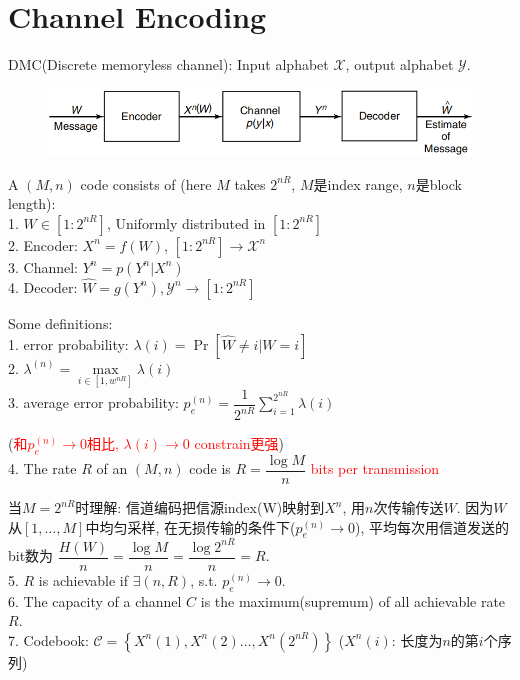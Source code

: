 \section{Channel Encoding}
\begin{definition}
DMC(Discrete memoryless channel): Input alphabet $\mathcal{X}$, output alphabet $\mathcal{Y}$.
\end{definition}
\begin{figure}[htbp]
    \centering
    \includegraphics[width=\textwidth]{./figures/chapter5/communication_system.png}
\end{figure}
A $(M, n)$ code consists of (here $M$ takes $2^{nR}$, $M$是index range, $n$是block length): \\
1. $W\in[1:2^{nR}]$, Uniformly distributed in $[1:2^{nR}]$ \\
2. Encoder: $X^n=f(W)$, $[1:2^{nR}]\to\mathcal{X}^n$ \\
3. Channel: $Y^n=p(Y^n|X^n)$ \\
4. Decoder: $\hat{W}=g(Y^n), \mathcal{Y}^n\to[1:2^{nR}]$

Some definitions: \\
1. error probability: $\lambda(i)=\Pr\left[\hat{W}\neq i | W=i\right]$ \\
2. $\lambda^{(n)}=\max\limits_{i\in[1,w^{nR}]}\lambda(i)$ \\
3. average error probability: $p_e^{(n)}=\dfrac{1}{2^{nR}}\sum\limits_{i=1}^{2^{nR}} \lambda(i)$

(\textcolor{red}{和$p_e^{(n)}\to 0$相比, $\lambda(i)\to 0$ constrain更强}) \\
4. The rate $R$ of an $(M,n)$ code is $R=\dfrac{\log M}{n}$ \textcolor{red}{bits per transmission}

当$M=2^{nR}$时理解: 信道编码把信源index(W)映射到$X^n$, 用$n$次传输传送$W$. 因为$W$从$[1,\ldots,M]$中均匀采样, 在无损传输的条件下($p_e^{(n)}\to 0$), 平均每次用信道发送的bit数为 $\dfrac{H(W)}{n}=\dfrac{\log M}{n}=\dfrac{\log 2^{nR}}{n}=R$. \\
5. $R$ is achievable if $\exists (n,R)$, s.t. $p_e^{(n)}\to 0$. \\
6. The capacity of a channel $C$ is the maximum(supremum) of all achievable rate $R$. \\
7. Codebook: $\mathcal{C}=\left\{X^n(1),X^n(2)\ldots,X^n(2^{nR})\right\}$ ($X^n(i)$: 长度为$n$的第$i$个序列)

